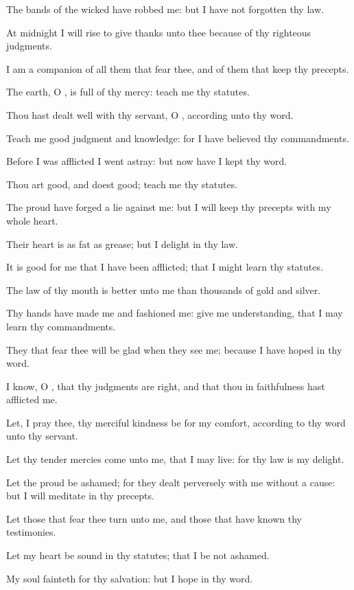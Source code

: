 \verse The bands of the wicked have robbed me: but I have not forgotten thy law.

\verse At midnight I will rise to give thanks unto thee because of thy righteous judgments.

\verse I am a companion of all them that fear thee, and of them that keep thy precepts.

\verse The earth, O \LORD, is full of thy mercy: teach me thy statutes.

\verse Thou hast dealt well with thy servant, O \LORD, according unto thy word.

\verse Teach me good judgment and knowledge: for I have believed thy commandments.

\verse Before I was afflicted I went astray: but now have I kept thy word.

\verse Thou art good, and doest good; teach me thy statutes.

\verse The proud have forged a lie against me: but I will keep thy precepts with my whole heart.

\verse Their heart is as fat as grease; but I delight in thy law.

\verse It is good for me that I have been afflicted; that I might learn thy statutes.

\verse The law of thy mouth is better unto me than thousands of gold and silver.

\verse Thy hands have made me and fashioned me: give me understanding, that I may learn thy commandments.

\verse They that fear thee will be glad when they see me; because I have hoped in thy word.

\verse I know, O \LORD, that thy judgments are right, and that thou in faithfulness hast afflicted me.

\verse Let, I pray thee, thy merciful kindness be for my comfort, according to thy word unto thy servant.

\verse Let thy tender mercies come unto me, that I may live: for thy law is my delight.

\verse Let the proud be ashamed; for they dealt perversely with me without a cause: but I will meditate in thy precepts.

\verse Let those that fear thee turn unto me, and those that have known thy testimonies.

\verse Let my heart be sound in thy statutes; that I be not ashamed.

\verse My soul fainteth for thy salvation: but I hope in thy word.

